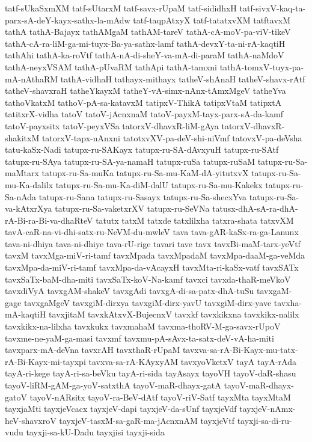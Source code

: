 {tatf-sUkaSxmXM
tatf-sUtarxM
tatf-savx-rUpaM
tatf-sididhxH
tatf-sivxV-kaq-ta-parx-sA-deY-kayx-sathx-la-mAdw
tatf-taqpAtxyX
tatf-tatatxvXM
tatftavxM
tathA
tathA-Bajayx
tathAMgaM
tathAM-tareV
tathA-cA-moV-pa-viV-tikeV
tathA-cA-ra-liM-ga-mi-tuyx-Ba-ya-sathx-lamf
tathA-devxY-ta-ni-rA-kaqtiH
tathAhi
tathA-ka-roVtf
tathA-nA-di-sheY-va-mA-di-paraM
tathA-naMdoV
tathA-neyxVSAM
tathA-pUvaRM
tathApi
tathA-tamxni
tathA-tomxV-tuyx-pa-mA-nAthaRM
tathA-vidhaH
tathayx-mithayx
tatheV-shAnaH
tatheV-shavx-rAtf
tatheV-shavxraH
tatheYkayxM
tatheY-vA-simx-nAnx-tAmxMgeV
tatheYva
tathoVkatxM
tathoV-pA-sa-katavxM
tatipxV-ThikA
tatipxVtaM
tatipxtA
tatitxrX-vidha
tatoV
tatoV-jAcnxnaM
tatoV-payxM-tayx-parx-sA-da-kamf
tatoV-payxsitx
tatoV-peyxVSa
tatorxV-dhavxR-liM-gAya
tatorxV-dhavxR-shakitxM
tatorxV-tapx-nAnxni
tatotxvXV-pa-deV-shi-niVmf
tatovxV-pa-deVsha
tatu-kaSx-Nadi
tatupx-ru-SAKayx
tatupx-ru-SA-dAvxyuH
tatupx-ru-SAtf
tatupx-ru-SAya
tatupx-ru-SA-ya-namaH
tatupx-ruSa
tatupx-ruSaM
tatupx-ru-Sa-maMtarx
tatupx-ru-Sa-muKa
tatupx-ru-Sa-mu-KaM-dA-yitutxvX
tatupx-ru-Sa-mu-Ka-dalilx
tatupx-ru-Sa-mu-Ka-diM-dalU
tatupx-ru-Sa-mu-Kakekx
tatupx-ru-Sa-nAda
tatupx-ru-Sana
tatupx-ru-Sasayx
tatupx-ru-Sa-shecxYva
tatupx-ru-Sa-va-kAtxrXya
tatupx-ru-Sa-vaketxrXV
tatupx-ru-SeVNa
tatusx-dhA-sA-ra-dhA-rA-Bi-ra-Bi-va-dhaRteV
tatutx
tatxM
tatxde
tatxlilxha
tatxra-shata
tatxvXM
tavA-caR-na-vi-dhi-satx-ru-NeVM-du-mwleV
tava
tava-gAR-kaSx-ra-ga-Lanunx
tava-ni-dhiya
tava-ni-dhiye
tava-rU-rige
tavari
tave
tavx
tavxBi-maM-tarx-yeVtf
tavxM
tavxMga-miV-ri-tamf
tavxMpada
tavxMpadaM
tavxMpa-daaM-ga-veMda
tavxMpa-da-miV-ri-tamf
tavxMpa-da-vAcayxH
tavxMta-ri-kaSx-vatf
tavxSATx
tavxSaTx-baM-dha-miti
tavxSaTx-koV-Na-kamf
tavxci
tavxda-thaR-meVkoV
tavxdiVyA
tavxgAM-shakeV
tavxgAdi
tavxgA-di-sa-patx-dhA-tuSu
tavxgaM-gage
tavxgaMgeV
tavxgiM-dirxya
tavxgiM-dirx-yavU
tavxgiM-dirx-yave
tavxha-mA-kaqtiH
tavxjitaM
tavxkAtxvX-BujecnxV
tavxkf
tavxkikxna
tavxkikx-nalilx
tavxkikx-na-lilxha
tavxkukx
tavxmahaM
tavxma-thoRV-M-ga-savx-rUpoV
tavxme-ne-yaM-ga-masi
tavxmf
tavxmu-pA-sAvx-ta-satx-deV-vA-ha-miti
tavxparx-mA-deVna
tavxrAH
tavxthaR-rUpaM
tavxva-sa-rA-Bi-Kayx-mu-tatx-rA-Bi-Kayx-mi-tayxpi
tavxva-sa-rA-KAyxyAM
tavxyoVketxV
tayA
tayA-rAda
tayA-ri-kege
tayA-ri-sa-beVku
tayA-ri-sida
tayAsayx
tayoVH
tayoV-daR-shasu
tayoV-liRM-gAM-ga-yoV-satxthA
tayoV-maR-dhayx-gatA
tayoV-maR-dhayx-gatoV
tayoV-nARsitx
tayoV-ra-BeV-dAtf
tayoV-riV-Satf
tayxMta
tayxMtaM
tayxjaMti
tayxjeVcacx
tayxjeV-dapi
tayxjeV-da-sUnf
tayxjeVdf
tayxjeV-nAmx-heV-shavxroV
tayxjeV-tasxM-sa-gaR-ma-jAcnxnAM
tayxjeVtf
tayxji-sa-di-ru-vudu
tayxji-sa-kU-Dadu
tayxjisi
tayxji-sida
}
